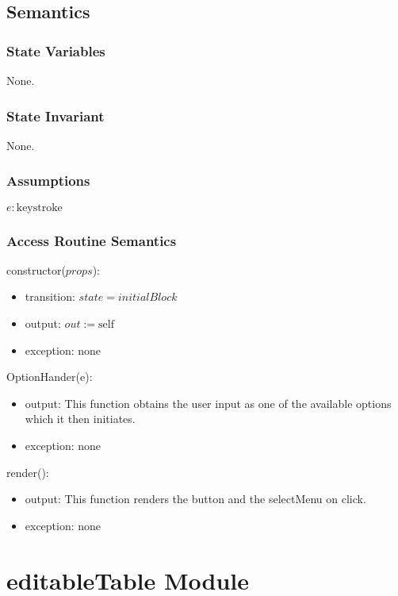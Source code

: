\documentclass[12pt, titlepage]{article}
\begin{document}
\subsection{Semantics}

\subsubsection{State Variables}

None.

\subsubsection{State Invariant}

None.

\subsubsection{Assumptions}

$\mathit{e}: \text{keystroke}$

\subsubsection{Access Routine Semantics}

\noindent constructor($props$):
\begin{itemize}
\item transition: $\mathit{state} = initialBlock$
\item output: $out := \mbox{self}$
\item exception: none
\end{itemize}

\noindent OptionHander(e):
\begin{itemize}
\item output: This function obtains the user input as one of the available options which it then initiates.
\item exception: none
\end{itemize}

\noindent render():
\begin{itemize}
\item output: This function renders the button and the selectMenu on click.
\item exception: none
\end{itemize}

\newpage

\section{editableTable Module}
\end{document}
